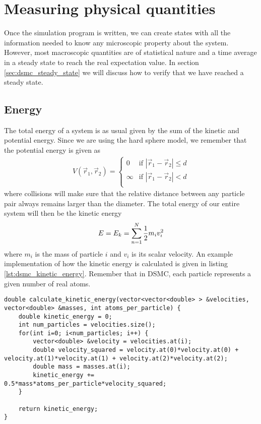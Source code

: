 \section{Measuring physical quantities}
Once the simulation program is written, we can create states with all the information needed to know any microscopic property about the system. However, most macroscopic quantities are of statistical nature and 
 a time average in a steady state to reach the real expectation value. In section \ref{sec:dsmc_steady_state} we will discuss how to verify that we have reached a steady state. 
\subsection{Energy}
The total energy of a system is as usual given by the sum of the kinetic and potential energy. Since we are using the hard sphere model, we remember that the potential energy is given as
\begin{align}
	V(\vec r_1, \vec r_2) = \left\{
	\begin{array}{lr}
	0 & \text{if } |\vec r_1  - \vec r_2| \leq d\\
	\infty & \text{if } |\vec r_1  - \vec r_2| < d\\
	\end{array}
	\right .
\end{align}
where collisions will make sure that the relative distance between any particle pair always remains larger than the diameter. The total energy of our entire system will then be the kinetic energy
\begin{align}
	E = E_k = \sum_{n=1}^N {1\over 2}m_iv_i^2
\end{align}
where $m_i$ is the mass of particle $i$ and $v_i$ is its scalar velocity. An example implementation of how the kinetic energy is calculated is given in listing \ref{lst:dsmc_kinetic_energy}. Remember that in DSMC, each particle represents a given number of real atoms.

\begin{lstlisting}[caption=Calculation of kinetic energy., label=lst:dsmc_kinetic_energy]
double calculate_kinetic_energy(vector<vector<double> > &velocities, vector<double> &masses, int atoms_per_particle) {
	double kinetic_energy = 0;
	int num_particles = velocities.size();
	for(int i=0; i<num_particles; i++) {
		vector<double> &velocity = velocities.at(i);
		double velocity_squared = velocity.at(0)*velocity.at(0) + velocity.at(1)*velocity.at(1) + velocity.at(2)*velocity.at(2);
		double mass = masses.at(i);
		kinetic_energy += 0.5*mass*atoms_per_particle*velocity_squared;
	}

	return kinetic_energy;
}
\end{lstlisting}

